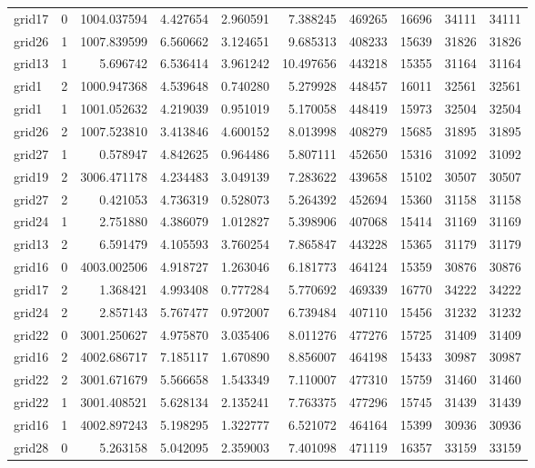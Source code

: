 \begin{longtable}{|l|r|r|r|r|r|r|r|r|r|}
grid17 & 0 & 1004.037594 & 4.427654 & 2.960591 & 7.388245 & 469265 & 16696 & 34111 & 34111 \\
grid26 & 1 & 1007.839599 & 6.560662 & 3.124651 & 9.685313 & 408233 & 15639 & 31826 & 31826 \\
grid13 & 1 & 5.696742 & 6.536414 & 3.961242 & 10.497656 & 443218 & 15355 & 31164 & 31164 \\
grid1 & 2 & 1000.947368 & 4.539648 & 0.740280 & 5.279928 & 448457 & 16011 & 32561 & 32561 \\
grid1 & 1 & 1001.052632 & 4.219039 & 0.951019 & 5.170058 & 448419 & 15973 & 32504 & 32504 \\
grid26 & 2 & 1007.523810 & 3.413846 & 4.600152 & 8.013998 & 408279 & 15685 & 31895 & 31895 \\
grid27 & 1 & 0.578947 & 4.842625 & 0.964486 & 5.807111 & 452650 & 15316 & 31092 & 31092 \\
grid19 & 2 & 3006.471178 & 4.234483 & 3.049139 & 7.283622 & 439658 & 15102 & 30507 & 30507 \\
grid27 & 2 & 0.421053 & 4.736319 & 0.528073 & 5.264392 & 452694 & 15360 & 31158 & 31158 \\
grid24 & 1 & 2.751880 & 4.386079 & 1.012827 & 5.398906 & 407068 & 15414 & 31169 & 31169 \\
grid13 & 2 & 6.591479 & 4.105593 & 3.760254 & 7.865847 & 443228 & 15365 & 31179 & 31179 \\
grid16 & 0 & 4003.002506 & 4.918727 & 1.263046 & 6.181773 & 464124 & 15359 & 30876 & 30876 \\
grid17 & 2 & 1.368421 & 4.993408 & 0.777284 & 5.770692 & 469339 & 16770 & 34222 & 34222 \\
grid24 & 2 & 2.857143 & 5.767477 & 0.972007 & 6.739484 & 407110 & 15456 & 31232 & 31232 \\
grid22 & 0 & 3001.250627 & 4.975870 & 3.035406 & 8.011276 & 477276 & 15725 & 31409 & 31409 \\
grid16 & 2 & 4002.686717 & 7.185117 & 1.670890 & 8.856007 & 464198 & 15433 & 30987 & 30987 \\
grid22 & 2 & 3001.671679 & 5.566658 & 1.543349 & 7.110007 & 477310 & 15759 & 31460 & 31460 \\
grid22 & 1 & 3001.408521 & 5.628134 & 2.135241 & 7.763375 & 477296 & 15745 & 31439 & 31439 \\
grid16 & 1 & 4002.897243 & 5.198295 & 1.322777 & 6.521072 & 464164 & 15399 & 30936 & 30936 \\
grid28 & 0 & 5.263158 & 5.042095 & 2.359003 & 7.401098 & 471119 & 16357 & 33159 & 33159 \\

\end{longtable}
